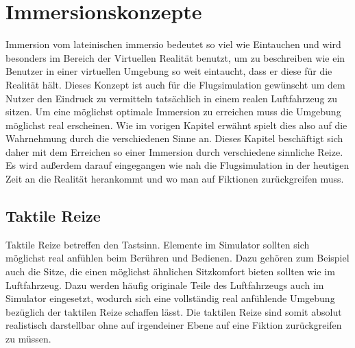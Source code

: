 \documentclass[12pt]{article}
\begin{document}
\section{Immersionskonzepte}
Immersion vom lateinischen \glqq immersio\grqq{} bedeutet so viel wie Eintauchen und wird besonders im Bereich der Virtuellen Realität benutzt, um zu beschreiben wie ein Benutzer in einer virtuellen Umgebung so weit eintaucht, dass er diese für die Realität hält. Dieses Konzept ist auch für die Flugsimulation gewünscht um dem Nutzer den Eindruck zu vermitteln tatsächlich in einem realen Luftfahrzeug zu sitzen. Um eine möglichst optimale Immersion zu erreichen muss die Umgebung möglichst real erscheinen. Wie im vorigen Kapitel erwähnt spielt dies also auf die Wahrnehmung durch die verschiedenen Sinne an. Dieses Kapitel beschäftigt sich daher mit dem Erreichen so einer Immersion durch verschiedene sinnliche Reize. Es wird außerdem darauf eingegangen wie nah die Flugsimulation in der heutigen Zeit an die Realität herankommt und wo man auf Fiktionen zurückgreifen muss.

\subsection{Taktile Reize}\label{taktil}
Taktile Reize betreffen den Tastsinn. Elemente im Simulator sollten sich möglichst real anfühlen beim Berühren und Bedienen. Dazu gehören zum Beispiel auch die Sitze, die einen möglichst ähnlichen Sitzkomfort bieten sollten wie im Luftfahrzeug. Dazu werden häufig originale Teile des Luftfahrzeugs auch im Simulator eingesetzt, wodurch sich eine vollständig real anfühlende Umgebung bezüglich der taktilen Reize schaffen lässt. Die taktilen Reize sind somit absolut realistisch darstellbar ohne auf irgendeiner Ebene auf eine Fiktion zurückgreifen zu müssen.
\end{document}
